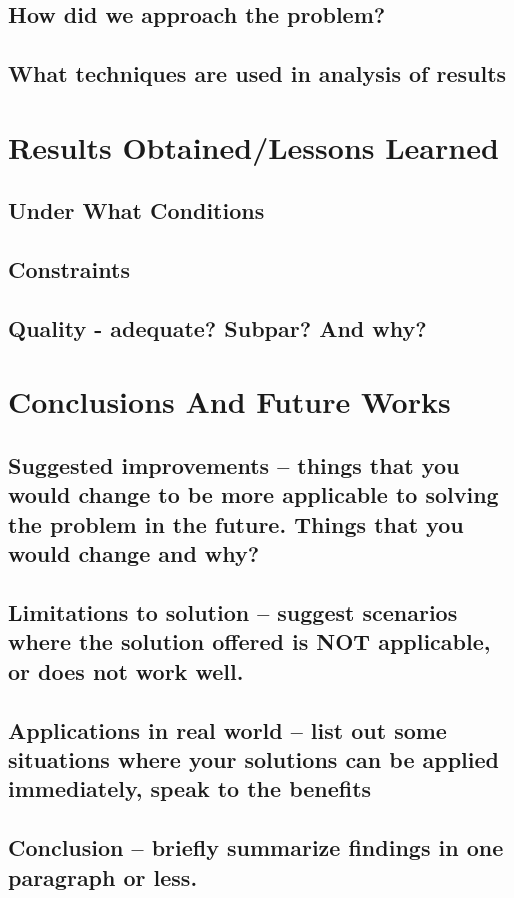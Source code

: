 \subsection{How did we approach the problem?}
\vspace{-1.5mm}
\subsection{What techniques are used in analysis of results}
\newpage
\section{Results Obtained/Lessons Learned}
\subsection{Under What Conditions}
\vspace{-1.5mm}
\subsection{Constraints}
\vspace{-1.5mm}
\subsection{Quality - adequate? Subpar? And why?}
\newpage
\section{Conclusions And Future Works}
\subsection{Suggested improvements -- things that you would change to be more applicable to solving the problem in the future. Things that you would change and why?}
\vspace{-1.5mm}
\subsection{Limitations to solution -- suggest scenarios where the solution offered is NOT applicable, or does not work well.}
\vspace{-1.5mm}
\subsection{ Applications in real world -- list out some situations where your solutions can be applied immediately, speak to the benefits}
\vspace{-1.5mm}
\subsection{ Conclusion -- briefly summarize findings in one paragraph or less.}